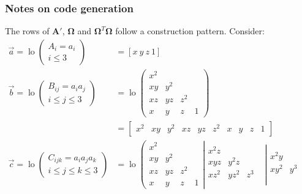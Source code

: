 \documentclass{article}
\def\mat#1{\mathbf{#1}}
\begin{document}
\subsubsection*{Notes on code generation}
The rows of $\mat{A'}$, $\mat{\Omega}$ and $\mat{\Omega}^T\mat{\Omega}$ follow a construction pattern. Consider:
\begin{equation}
\begin{split}
\vec{a}= \operatorname{lo}\left(\begin{matrix}A_i=a_i\\ i \leq 3 \end{matrix}\right)
&=\left[x~y~z~1\right]\\
\vec{b}= \operatorname{lo}\left(\begin{matrix}B_{ij}=a_ia_j\\ i \leq j \leq 3 \end{matrix}\right)
&=\operatorname{lo}\left(\begin{matrix}
x^2 &     &     &   \\
xy  & y^2 &     &   \\
xz  & yz  & z^2 &   \\
x   & y   & z   & 1
\end{matrix}\right) \\
&= \left[\begin{matrix}
x^2 &
xy & y^2  &
xz & yz & z^2 & x & y & z & 1
\end{matrix}\right] \\
\vec{c}=\operatorname{lo}\left(\begin{matrix}C_{ijk}=a_ia_ja_k\\ i \leq j \leq k \leq 3 \end{matrix}\right)
&=\operatorname{lo}\left(\begin{matrix}
x^2 &     &     &   \\
xy  & y^2 &     &   \\
xz  & yz  & z^2 &   \\
x   & y   & z   & 1
\end{matrix}\right|
\left.\begin{matrix}
x^2z &      &       & \\
xyz  & y^2z &       & \\
xz^2 & yz^2 & z^3   & \\
     &      &       & 
\end{matrix}\right|
\left.\begin{matrix}
x^2y &      &  & \\
xy^2 & y^3  &  & \\

\end{matrix}
\end{split}
\end{equation}
\end{document}
